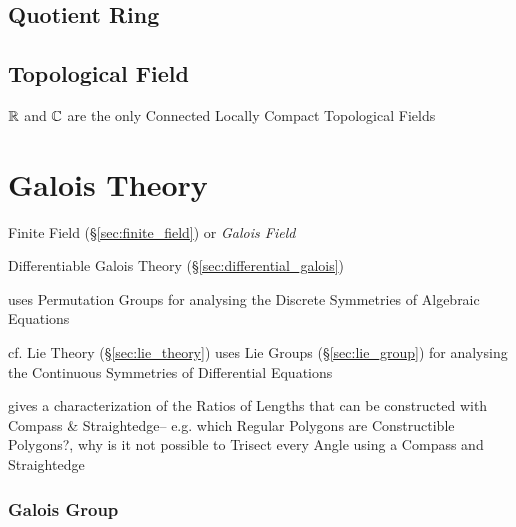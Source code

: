 \subsection{Quotient Ring}\label{sec:quotient_ring}

\subsection{Topological Field}\label{sec:topological_field}

$\mathbb{R}$ and $\mathbb{C}$ are the only Connected Locally Compact
Topological Fields



\section{Galois Theory}\label{sec:galois_theory}

Finite Field (\S\ref{sec:finite_field}) or \emph{Galois Field}

Differentiable Galois Theory (\S\ref{sec:differential_galois})

uses Permutation Groups for analysing the Discrete Symmetries of
Algebraic Equations %

cf. Lie Theory (\S\ref{sec:lie_theory}) uses Lie Groups
(\S\ref{sec:lie_group}) for analysing the Continuous Symmetries of
Differential Equations

gives a characterization of the Ratios of Lengths that can be constructed with
Compass \& Straightedge-- e.g. which Regular Polygons are Constructible
Polygons?, why is it not possible to Trisect every Angle using a Compass and
Straightedge



\subsubsection{Galois Group}\label{sec:galois_group}

